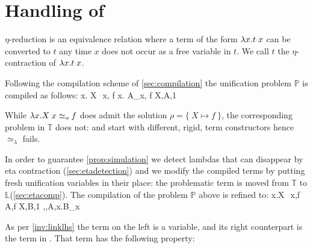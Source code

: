 \documentclass[sigconf,natbib=false,review]{acmart}
\newcommand{\appsep}{\ensuremath{\textcolor{lightgray}{\cdot}}}
\newcommand{\UnifRel}{\ensuremath{\simeq}}
\newcommand{\Uo}{\ensuremath{\UnifRel_o}\xspace}
\newcommand{\Ue}{\ensuremath{\UnifRel_\lambda}\xspace}
\newcommand{\linkStore}{\ensuremath{\mathbb{L}}\xspace}
\newcommand{\foUnifPb}{\ensuremath{\mathbb{P}}\xspace}
\newcommand{\hoUnifPb}{\ensuremath{\mathbb{T}}\xspace}
\begin{document}





\section{Handling of \maybeeta}\label{sec:eta}
$\eta$-reduction is an equivalence relation where a term of the form
$\lambda x.t \appsep x$ can be converted to $t$ any time $x$ does not occur as a
free variable in $t$. We call $t$ the $\eta$-contraction of
$\lambda x. t \appsep x$.

Following the compilation scheme of \cref{sec:compilation} the
unification problem \foUnifPb is compiled as follows:
%
\printAlll
  {{{\lambda x. X \appsep x, f}}}
  {{{\lambda x. A_x, f}}}
  {{{X,A,1}}}
  {{}}

\noindent
While $\lambda x.X \appsep x \Uo{} f$ does admit the solution
$\rho = \{~ X \mapsto f ~\}$, the corresponding problem in
\hoUnifPb does not:
 and
 start with different, rigid, term constructors hence
\Ue{} fails.

In order to guarantee \cref{prop:simulation} we detect
lambdas that can disappear by eta contraction (\cref{sec:etadetection}) and
we modify the compiled terms by putting fresh unification variables
in their place: the problematic term is moved 
from  \hoUnifPb to \linkStore (\cref{sec:etacomp}). The compilation
of the problem \foUnifPb above is refined to: 
%
\printAlll
  {{{\lambda x.X \appsep x,f}}}
  {{{A,f}}}
  {{{X,B,1}}}
  {{{\eta,,A,\lambda x.B_x}}}

\noindent
As per \cref{inv:linklhs} the term on the left is a variable, and its
right counterpart is the
term in \maybeeta. That term has the following property:
\end{document}
